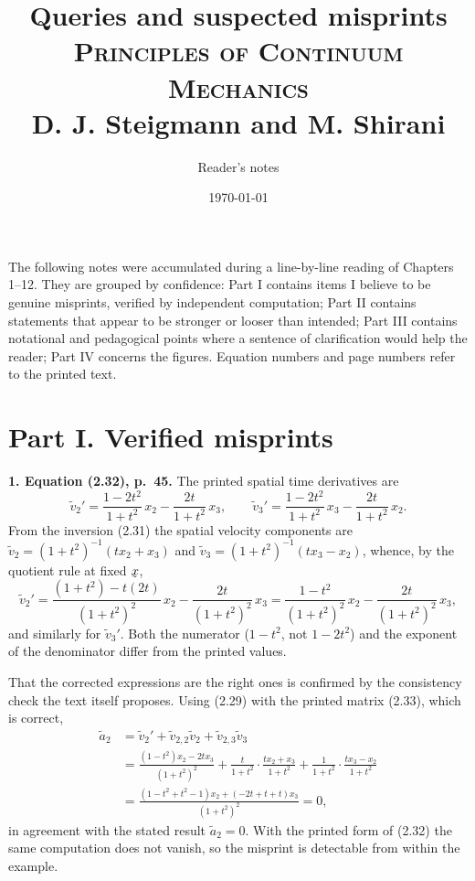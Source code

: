\documentclass[12pt,a4paper]{article}
\title{Queries and suspected misprints\\
\large\textsc{Principles of Continuum Mechanics}\\
\large D. J. Steigmann and M. Shirani}
\author{Reader's notes}
\date{\today}
\DeclareRobustCommand{\vek}[1]{\underaccent{\tilde}{#1}}
\newcommand{\bx}{\vek{x}}
\newenvironment{query}[1]%
  {\par\medskip\noindent\textbf{#1}\quad}{\par\medskip}
\begin{document}
\maketitle

\noindent
The following notes were accumulated during a line-by-line reading of
Chapters 1--12. They are grouped by confidence: Part I contains items I
believe to be genuine misprints, verified by independent computation;
Part II contains statements that appear to be stronger or looser than
intended; Part III contains notational and pedagogical points where a
sentence of clarification would help the reader; Part IV concerns the
figures. Equation numbers and page numbers refer to the printed text.

\section*{Part I. Verified misprints}

\begin{query}{1. Equation (2.32), p.~45.}
The printed spatial time derivatives are
\[
   \tilde v_2'=\frac{1-2t^{2}}{1+t^{2}}\,x_2-\frac{2t}{1+t^{2}}\,x_3,
   \qquad
   \tilde v_3'=\frac{1-2t^{2}}{1+t^{2}}\,x_3-\frac{2t}{1+t^{2}}\,x_2 .
\]
From the inversion (2.31) the spatial velocity components are
$\tilde v_2=(1+t^{2})^{-1}(tx_2+x_3)$ and
$\tilde v_3=(1+t^{2})^{-1}(tx_3-x_2)$, whence, by the quotient rule at
fixed $\bx$,
\[
   \tilde v_2'=\frac{(1+t^{2})-t(2t)}{(1+t^{2})^{2}}\,x_2
              -\frac{2t}{(1+t^{2})^{2}}\,x_3
             =\frac{1-t^{2}}{(1+t^{2})^{2}}\,x_2-\frac{2t}{(1+t^{2})^{2}}\,x_3,
\]
and similarly for $\tilde v_3'$. Both the numerator ($1-t^{2}$, not
$1-2t^{2}$) and the exponent of the denominator differ from the printed
values.

That the corrected expressions are the right ones is confirmed by the
consistency check the text itself proposes. Using (2.29) with the printed
matrix (2.33), which is correct,
\[
\begin{aligned}
   \tilde a_2&=\tilde v_2'+\tilde v_{2,2}\tilde v_2+\tilde v_{2,3}\tilde v_3\\
   &=\frac{(1-t^{2})x_2-2tx_3}{(1+t^{2})^{2}}
     +\frac{t}{1+t^{2}}\cdot\frac{tx_2+x_3}{1+t^{2}}
     +\frac{1}{1+t^{2}}\cdot\frac{tx_3-x_2}{1+t^{2}}\\
   &=\frac{(1-t^{2}+t^{2}-1)x_2+(-2t+t+t)x_3}{(1+t^{2})^{2}}=0,
\end{aligned}
\]
in agreement with the stated result $\tilde a_2=0$. With the printed form
of (2.32) the same computation does not vanish, so the misprint is
detectable from within the example.
\end{query}
\end{document}
